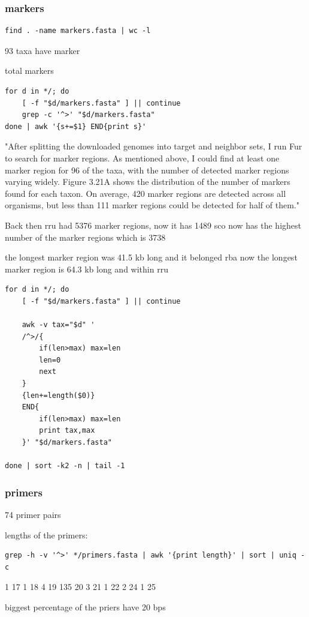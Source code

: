 \documentclass[11pt]{article}
\begin{document}
\subsubsection{markers}
\label{sec:orgb01a24b}

\begin{verbatim}
find . -name markers.fasta | wc -l
\end{verbatim}
93 taxa have marker

total markers
\begin{verbatim}
for d in */; do
    [ -f "$d/markers.fasta" ] || continue
    grep -c '^>' "$d/markers.fasta"
done | awk '{s+=$1} END{print s}'
\end{verbatim}

"After splitting the downloaded genomes into target and neighbor sets, I run Fur to search
for marker regions. As mentioned above, I could find at least one marker region for 96
of the taxa, with the number of detected marker regions varying widely. Figure 3.21A
shows the distribution of the number of markers found for each taxon. On average, 420
marker regions are detected across all organisms, but less than 111 marker regions could
be detected for half of them."

Back then rru had 5376 marker regions, now it has 1489
sco now has the highest number of the marker regions which is 3738


the longest marker region was 41.5 kb long and it belonged rba
now the longest marker region is 64.3 kb long and within rru
\begin{verbatim}
for d in */; do
    [ -f "$d/markers.fasta" ] || continue

    awk -v tax="$d" '
    /^>/{
        if(len>max) max=len
        len=0
        next
    }
    {len+=length($0)}
    END{
        if(len>max) max=len
        print tax,max
    }' "$d/markers.fasta"

done | sort -k2 -n | tail -1
\end{verbatim}
\subsubsection{primers}
\label{sec:org8712853}
74 primer pairs

lengths of the primers:
\begin{verbatim}
grep -h -v '^>' */primers.fasta | awk '{print length}' | sort | uniq -c
\end{verbatim}
  1 17
  1 18
  4 19
135 20
  3 21
  1 22
  2 24
  1 25

biggest percentage of the priers have 20 bps
\end{document}
